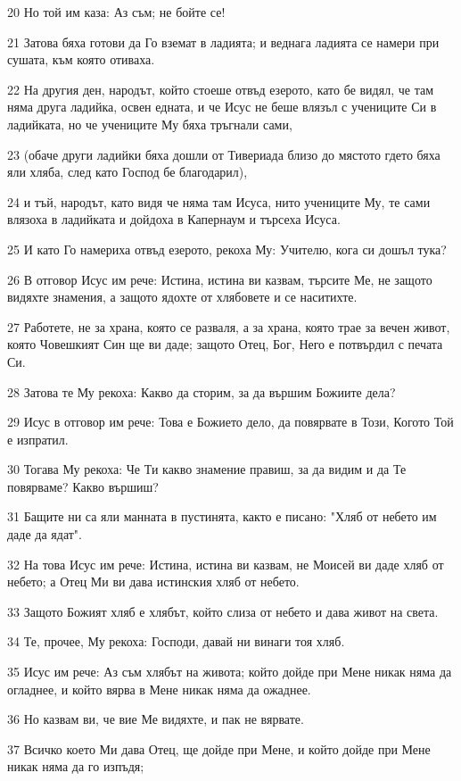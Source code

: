\par 20 Но той им каза: Аз съм; не бойте се!
\par 21 Затова бяха готови да Го вземат в ладията; и веднага ладията се намери при сушата, към която отиваха.
\par 22 На другия ден, народът, който стоеше отвъд езерото, като бе видял, че там няма друга ладийка, освен едната, и че Исус не беше влязъл с учениците Си в ладийката, но че учениците Му бяха тръгнали сами,
\par 23 (обаче други ладийки бяха дошли от Тивериада близо до мястото гдето бяха яли хляба, след като Господ бе благодарил),
\par 24 и тъй, народът, като видя че няма там Исуса, нито учениците Му, те сами влязоха в ладийката и дойдоха в Капернаум и търсеха Исуса.
\par 25 И като Го намериха отвъд езерото, рекоха Му: Учителю, кога си дошъл тука?
\par 26 В отговор Исус им рече: Истина, истина ви казвам, търсите Ме, не защото видяхте знамения, а защото ядохте от хлябовете и се наситихте.
\par 27 Работете, не за храна, която се разваля, а за храна, която трае за вечен живот, която Човешкият Син ще ви даде; защото Отец, Бог, Него е потвърдил с печата Си.
\par 28 Затова те Му рекоха: Какво да сторим, за да вършим Божиите дела?
\par 29 Исус в отговор им рече: Това е Божието дело, да повярвате в Този, Когото Той е изпратил.
\par 30 Тогава Му рекоха: Че Ти какво знамение правиш, за да видим и да Те повярваме? Какво вършиш?
\par 31 Бащите ни са яли манната в пустинята, както е писано: "Хляб от небето им даде да ядат".
\par 32 На това Исус им рече: Истина, истина ви казвам, не Моисей ви даде хляб от небето; а Отец Ми ви дава истинския хляб от небето.
\par 33 Защото Божият хляб е хлябът, който слиза от небето и дава живот на света.
\par 34 Те, прочее, Му рекоха: Господи, давай ни винаги тоя хляб.
\par 35 Исус им рече: Аз съм хлябът на живота; който дойде при Мене никак няма да огладнее, и който вярва в Мене никак няма да ожаднее.
\par 36 Но казвам ви, че вие Ме видяхте, и пак не вярвате.
\par 37 Всичко което Ми дава Отец, ще дойде при Мене, и който дойде при Мене никак няма да го изпъдя;
